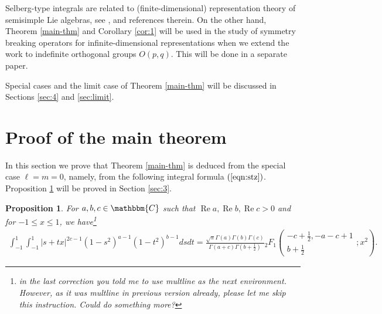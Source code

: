 \documentclass[12pt]{article}
\numberwithin{equation}{section}
\newcommand{\tmop}[1]{\ensuremath{\operatorname{#1}}}
\newtheorem{proposition}[corollary]{Proposition}
{\theorembodyfont{\rmfamily}\newtheorem{remark}[corollary]{Remark}}
\begin{document}
Selberg-type integrals are related to (finite-dimensional) representation
theory of semisimple Lie algebras, see {\cite{forrester2008importance}},
{\cite{tarasov2003selberg}} and references therein. On the other hand, Theorem
\ref{main-thm} and Corollary \ref{cor:1} will be used in the study of symmetry
breaking operators for infinite-dimensional representations when we extend the
work {\cite{kobayashi2015symmetry}} to indefinite orthogonal groups $O (p,
q)$. This will be done in a separate paper.

Special cases and the limit case of Theorem \ref{main-thm} will be discussed
in Sections \ref{sec:4} and \ref{sec:limit}.

\section{Proof of the main theorem}\label{sec:2}

In this section we prove that Theorem \ref{main-thm}
is deduced from the special case $\ell=m=0$, namely, from
the following
integral formula $(\ref{eqn:stz})$.
Proposition \ref{prop:2}
will be proved in Section
\ref{sec:3}.

\begin{proposition}
  \label{prop:2}For $a, b, c \in \mathbbm{C}$ such that $\tmop{Re} a,
  \tmop{Re} b, \tmop{Re} c > 0$ and for $- 1 \leqslant x \leqslant 1$, we have\footnote{in the last correction you told me to use {\ttfamily multline} as the next
  environment. However, as it was {\ttfamily multline} in previous version already, please let me skip this instruction. Could do something more?}
  \begin{multline}
     \displaystyle\int_{- 1}^1 \displaystyle\int_{- 1}^1 | s + t x |^{2 c - 1} (1 - s^2)^{a - 1} (1 -
    t^2)^{b - 1} d s d t = \frac{\sqrt{\pi} \Gamma (a) \Gamma (b) \Gamma
    (c)}{\Gamma (a + c) \Gamma \left( b + \frac{1}{2} \right)}{}_2 F_1 \left(
    \begin{array}{c}
      - c + \frac{1}{2}, - a - c + 1\\
      b + \frac{1}{2}
    \end{array} ; x^2 \right) .  \label{eqn:stz}
  \end{multline}
\end{proposition}
\end{document}
